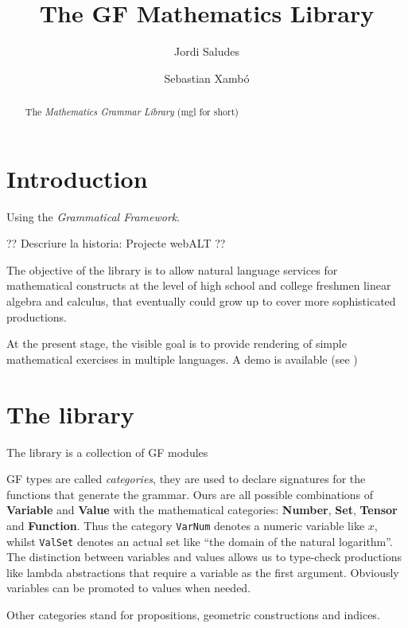 \documentclass[adraft,copyright,creativecommons]{eptcs}
\title{The GF Mathematics Library}
\author{Jordi Saludes
\institute{UPC}
\institute{Sistemes Avan\c cats de Control}\\
\email{jordi.saludes@upc.edu}
\and
Sebastian Xamb\'o
\institute{Universitat Polit\`ecnica de Catalunya.\\Barcelona, Spain}
\email{\quad ??}
}
\begin{document}
\maketitle

\begin{abstract}
The \emph{Mathematics Grammar Library} (mgl for short)
\end{abstract}

\section{Introduction} %
\label{sec:introduction}

Using the \emph{Grammatical Framework\cite{GF}}.

?? Descriure la historia: Projecte webALT ??

The objective of the library is to allow natural language services for mathematical constructs at the level of high school and
college freshmen linear algebra and calculus, that eventually could grow up to cover more sophisticated productions.

At the present stage, the visible goal is to provide rendering of simple mathematical exercises in multiple languages.
A demo is available (see \cite{MathBar})







\section{The library} %
\label{sec:the_library}
The library is a collection of GF modules


GF types are called \emph{categories}, they are used to declare signatures for the functions that generate the grammar.
Ours are all possible combinations of \textbf{Variable} and \textbf{Value} with the mathematical categories: \textbf{Number}, \textbf{Set}, \textbf{Tensor} and \textbf{Function}.
Thus the category \texttt{VarNum} denotes a numeric variable like $x$, whilst \texttt{ValSet} denotes an actual set like ``the domain of the natural logarithm''.
The distinction between variables and values allows us to type-check productions like lambda abstractions that require a variable as the first argument.
Obviously variables can be promoted to values when needed.

Other categories stand for propositions, geometric constructions and indices.
\end{document}
